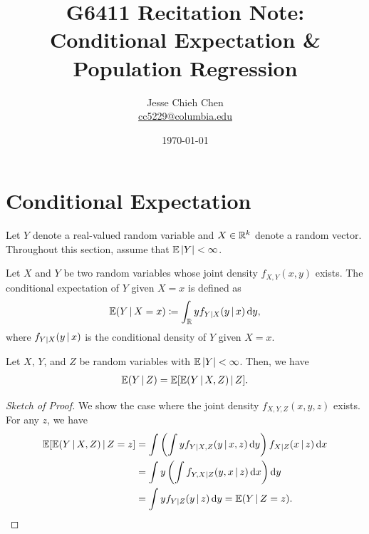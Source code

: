 \documentclass[a4paper,12pt]{article}
\title{G6411 Recitation Note:\\Conditional Expectation \& Population Regression}
\author{Jesse Chieh Chen\\\href{mailto:cc5229@columbia.edu}{cc5229@columbia.edu}}
\date{\today}
\begin{document}
\maketitle

\section{Conditional Expectation}

Let $Y$ denote a real-valued random variable and $X\in\mathbb{R}^k$ denote a random vector.
Throughout this section, assume that $\operatorname{\mathbb{E}}|Y|<\infty$.

\begin{definition}\label{def-conditional-expectation}
	Let $X$ and $Y$ be two random variables whose joint density $f_{X,Y}(x,y)$ exists.
	The conditional expectation of $Y$ given $X=x$ is defined as
	\begin{align}
		\operatorname{\mathbb{E}}(Y\mathpunct{}|\mathpunct{} X=x) \coloneqq \int_{\mathbb{R}} y f_{Y\mathpunct{}|\mathpunct{} X}(y\mathpunct{}|\mathpunct{} x) \mathop{}\!{\mathrm{d}}{y},
	\end{align}
	where $f_{Y\mathpunct{}|\mathpunct{} X}(y\mathpunct{}|\mathpunct{} x)$ is the conditional density of $Y$ given $X=x$.
\end{definition}


\begin{theorem}\label{thm-lie}
	Let $X$, $Y$, and $Z$ be random variables with $\operatorname{\mathbb{E}}|Y|<\infty$.
	Then, we have
	\begin{align}
		\operatorname{\mathbb{E}} (Y\mathpunct{}|\mathpunct{} Z) = \operatorname{\mathbb{E}}[\operatorname{\mathbb{E}}(Y\mathpunct{}|\mathpunct{} X,Z)\mathpunct{}|\mathpunct{} Z].
	\end{align}
\end{theorem}
\begin{proof}[Sketch of Proof]
	We show the case where the joint density $f_{X,Y,Z}(x,y,z)$ exists.
	For any $z$, we have
	\begin{align*}
		\operatorname{\mathbb{E}}[\operatorname{\mathbb{E}}(Y\mathpunct{}|\mathpunct{} X,Z)\mathpunct{}|\mathpunct{} Z=z]
		&= \int \left(\int y f_{Y\mathpunct{}|\mathpunct{} X,Z}(y\mathpunct{}|\mathpunct{} x,z) \mathop{}\!{\mathrm{d}}{y}\right) f_{X\mathpunct{}|\mathpunct{} Z}(x\mathpunct{}|\mathpunct{} z) \mathop{}\!{\mathrm{d}}{x} \\
		&= \int y \left(\int f_{Y, X\mathpunct{}|\mathpunct{} Z}(y, x\mathpunct{}|\mathpunct{} z) \mathop{}\!{\mathrm{d}}{x}\right) \mathop{}\!{\mathrm{d}}{y} \\
		&= \int y f_{Y\mathpunct{}|\mathpunct{} Z}(y\mathpunct{}|\mathpunct{} z) \mathop{}\!{\mathrm{d}}{y} = \operatorname{\mathbb{E}}(Y\mathpunct{}|\mathpunct{} Z=z).
		\qedhere
	\end{align*}
\end{proof}
\end{document}
